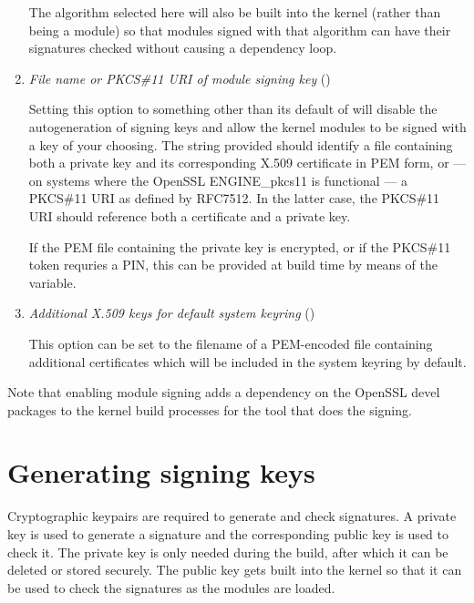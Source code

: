 \documentclass[a4paper,8pt,english]{sphinxmanual}
\begin{document}
\begin{enumerate}
\begin{quote}
\end{quote}

The algorithm selected here will also be built into the kernel (rather
than being a module) so that modules signed with that algorithm can have
their signatures checked without causing a dependency loop.

\item {} 
\emph{File name or PKCS\#11 URI of module signing key}
()

Setting this option to something other than its default of
 will disable the autogeneration of signing keys
and allow the kernel modules to be signed with a key of your choosing.
The string provided should identify a file containing both a private key
and its corresponding X.509 certificate in PEM form, or — on systems where
the OpenSSL ENGINE\_pkcs11 is functional — a PKCS\#11 URI as defined by
RFC7512. In the latter case, the PKCS\#11 URI should reference both a
certificate and a private key.

If the PEM file containing the private key is encrypted, or if the
PKCS\#11 token requries a PIN, this can be provided at build time by
means of the  variable.

\item {} 
\emph{Additional X.509 keys for default system keyring}
()

This option can be set to the filename of a PEM-encoded file containing
additional certificates which will be included in the system keyring by
default.

\end{enumerate}

Note that enabling module signing adds a dependency on the OpenSSL devel
packages to the kernel build processes for the tool that does the signing.


\section{Generating signing keys}
\label{admin-guide/module-signing:generating-signing-keys}
Cryptographic keypairs are required to generate and check signatures.  A
private key is used to generate a signature and the corresponding public key is
used to check it.  The private key is only needed during the build, after which
it can be deleted or stored securely.  The public key gets built into the
kernel so that it can be used to check the signatures as the modules are
loaded.
\end{document}
